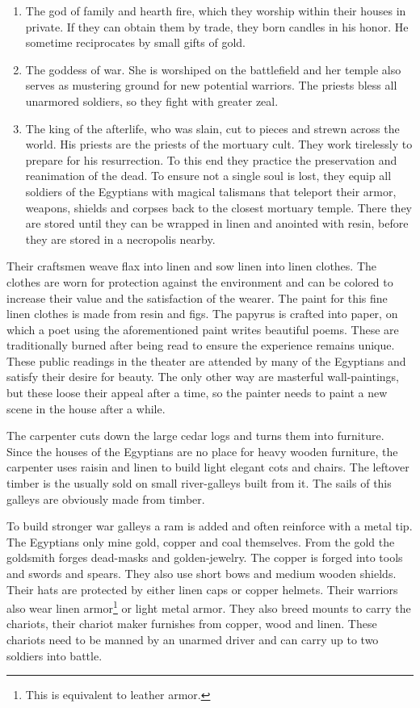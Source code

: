\begin{enumerate}
	\item The god of family and hearth fire, which they worship within their houses in
	      private. If they can obtain them by trade, they born candles in his honor. He
	      sometime reciprocates by small gifts of gold.
	\item The goddess of war. She is worshiped on the battlefield and her temple also
	      serves as mustering ground for new potential warriors. The priests bless all
	      unarmored soldiers, so they fight with greater zeal.
	\item The king of the afterlife, who was slain, cut to pieces and strewn across the
	      world. His priests are the priests of the mortuary cult. They work tirelessly
	      to prepare for his resurrection. To this end they practice the preservation and
	      reanimation of the dead. To ensure not a single soul is lost, they equip all
	      soldiers of the \gls{Egyptians} with magical talismans that teleport their
	      armor, weapons, shields and corpses back to the closest mortuary temple. There
	      they are stored until they can be wrapped in linen and anointed with resin,
	      before they are stored in a necropolis nearby.
\end{enumerate}

Their craftsmen weave flax into linen and sow linen into linen clothes. The
clothes are worn for protection against the environment and can be colored to
increase their value and the satisfaction of the wearer. The paint for this
fine linen clothes is made from resin and figs. The papyrus is crafted into
paper, on which a poet using the aforementioned paint writes beautiful poems.
These are traditionally burned after being read to ensure the experience
remains unique. These public readings in the theater are attended by many of
the \gls{Egyptians} and satisfy their desire for beauty. The only other way are
masterful wall-paintings, but these loose their appeal after a time, so the
painter needs to paint a new scene in the house after a while.

The carpenter cuts down the large cedar logs and turns them into furniture.
Since the houses of the \gls{Egyptians} are no place for heavy wooden
furniture, the carpenter uses raisin and linen to build light elegant cots and
chairs. The leftover timber is the usually sold on small river-galleys built
from it. The sails of this galleys are obviously made from timber.

To build stronger war galleys a ram is added and often reinforce with a metal
tip. The \gls{Egyptians} only mine gold, copper and coal themselves. From the
gold the goldsmith forges dead-masks and golden-jewelry. The copper is forged
into tools and swords and spears. They also use short bows and medium wooden
shields. Their hats are protected by either linen caps or copper helmets. Their
warriors also wear linen armor\footnote{ This is equivalent to leather armor. }
or light metal armor. They also breed mounts to carry the chariots, their
chariot maker furnishes from copper, wood and linen. These chariots need to be
manned by an unarmed driver and can carry up to two soldiers into battle.

